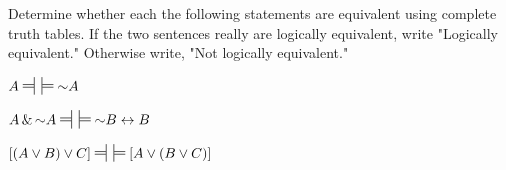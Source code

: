 \noindent\problempart
\label{pr.TT.equiv}
Determine whether each the following statements are equivalent using complete truth tables. If the two sentences really are logically equivalent, write "Logically equivalent." Otherwise write, "Not logically equivalent." 
\begin{earg}
\item $A\ndststile{}{} \hspace{.5em} \sdtstile{}{} \enot A$\vspace{.5ex} %


\item $A \eand \enot A\ndststile{}{} \hspace{.5em} \sdtstile{}{} \enot B \eiff B$\vspace{.5ex} %



\item $[(A \eor B) \eor C]\ndststile{}{} \hspace{.5em} \sdtstile{}{} [A \eor (B \eor C)]$\vspace{.5ex} %


\end{earg}
